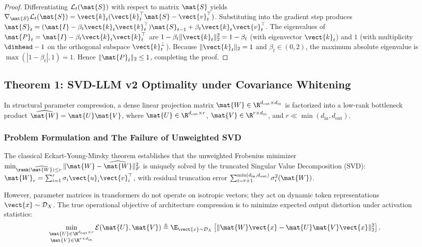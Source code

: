 \begin{proof}
Differentiating $\mathcal{L}_t(\mat{S})$ with respect to matrix $\mat{S}$ yields $\nabla_{\mat{S}} \mathcal{L}_t(\mat{S}) = \vect{k}_t (\vect{k}_t^\top \mat{S} - \vect{v}_t^\top)$. Substituting into the gradient step produces $\mat{S}_t = (\mat{I} - \beta_t \vect{k}_t \vect{k}_t^\top) \mat{S}_{t-1} + \beta_t \vect{k}_t \vect{v}_t^\top$. The eigenvalues of $\mat{P}_t = \mat{I} - \beta_t \vect{k}_t \vect{k}_t^\top$ are $1 - \beta_t \|\vect{k}_t\|_2^2 = 1 - \beta_t$ (with eigenvector $\vect{k}_t$) and $1$ (with multiplicity $\dimhead - 1$ on the orthogonal subspace $\vect{k}_t^\perp$). Because $\|\vect{k}_t\|_2 = 1$ and $\beta_t \in (0, 2)$, the maximum absolute eigenvalue is $\max(|1 - \beta_t|, 1) = 1$. Hence $\|\mat{P}_t\|_2 \le 1$, completing the proof.
\end{proof}

\subsection{Theorem 1: SVD-LLM v2 Optimality under Covariance Whitening}
\label{sec:thm_svdllm_v2}

In structural parameter compression, a dense linear projection matrix $\mat{W} \in \R^{d_{\text{out}} \times d_{\text{in}}}$ is factorized into a low-rank bottleneck product $\widehat{\mat{W}} = \mat{U} \mat{V}$, where $\mat{U} \in \R^{d_{\text{out}} \times r}$, $\mat{V} \in \R^{r \times d_{\text{in}}}$, and $r \ll \min(d_{\text{in}}, d_{\text{out}})$.

\subsubsection{Problem Formulation and The Failure of Unweighted SVD}
The classical Eckart-Young-Mirsky theorem \cite{eckart1936approximation} establishes that the unweighted Frobenius minimizer $\min_{\rank(\widehat{\mat{W}}) \le r} \|\mat{W} - \widehat{\mat{W}}\|_F^2$ is uniquely solved by the truncated Singular Value Decomposition (SVD): $\mat{W}_r = \sum_{i=1}^r \sigma_i \vect{u}_i \vect{v}_i^\top$, with residual truncation error $\sum_{i=r+1}^{\min(d_{\text{in}}, d_{\text{out}})} \sigma_i^2(\mat{W})$.

However, parameter matrices in transformers do not operate on isotropic vectors; they act on dynamic token representations $\vect{x} \sim \mathcal{D}_X$. The true operational objective of architecture compression is to minimize expected output distortion under activation statistics:
\begin{equation}
\min_{\substack{\mat{U} \in \R^{d_{\text{out}} \times r} \\ \mat{V} \in \R^{r \times d_{\text{in}}}}} \mathcal{E}(\mat{U}, \mat{V}) \triangleq \E_{\vect{x} \sim \mathcal{D}_X} \left[ \| \mat{W} \vect{x} - \mat{U} \mat{V} \vect{x} \|_2^2 \right].
\label{eq:expected_output_distortion}
\end{equation}

